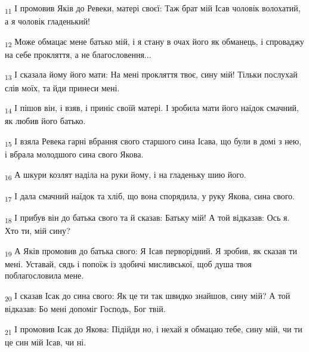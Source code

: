 \begin{tcolorbox}
\textsubscript{11} І промовив Яків до Ревеки, матері своєї: Таж брат мій Ісав чоловік волохатий, а я чоловік гладенький!
\end{tcolorbox}
\begin{tcolorbox}
\textsubscript{12} Може обмацає мене батько мій, і я стану в очах його як обманець, і спроваджу на себе прокляття, а не благословення...
\end{tcolorbox}
\begin{tcolorbox}
\textsubscript{13} І сказала йому його мати: На мені прокляття твоє, сину мій! Тільки послухай слів моїх, та йди принеси мені.
\end{tcolorbox}
\begin{tcolorbox}
\textsubscript{14} І пішов він, і взяв, і приніс своїй матері. І зробила мати його наїдок смачний, як любив його батько.
\end{tcolorbox}
\begin{tcolorbox}
\textsubscript{15} І взяла Ревека гарні вбрання свого старшого сина Ісава, що були в домі з нею, і вбрала молодшого сина свого Якова.
\end{tcolorbox}
\begin{tcolorbox}
\textsubscript{16} А шкури козлят наділа на руки йому, і на гладеньку шию його.
\end{tcolorbox}
\begin{tcolorbox}
\textsubscript{17} І дала смачний наїдок та хліб, що вона спорядила, у руку Якова, сина свого.
\end{tcolorbox}
\begin{tcolorbox}
\textsubscript{18} І прибув він до батька свого та й сказав: Батьку мій! А той відказав: Ось я. Хто ти, мій сину?
\end{tcolorbox}
\begin{tcolorbox}
\textsubscript{19} А Яків промовив до батька свого: Я Ісав перворідний. Я зробив, як сказав ти мені. Уставай, сядь і попоїж із здобичі мисливської, щоб душа твоя поблагословила мене.
\end{tcolorbox}
\begin{tcolorbox}
\textsubscript{20} І сказав Ісак до сина свого: Як це ти так швидко знайшов, сину мій? А той відказав: Бо мені допоміг Господь, Бог твій.
\end{tcolorbox}
\begin{tcolorbox}
\textsubscript{21} І промовив Ісак до Якова: Підійди но, і нехай я обмацаю тебе, сину мій, чи ти це син мій Ісав, чи ні.
\end{tcolorbox}
